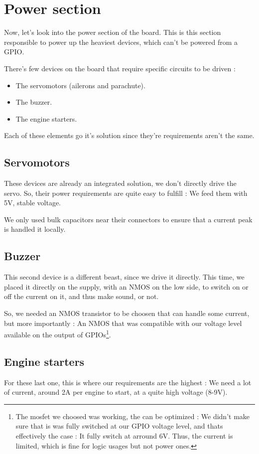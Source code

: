\section{Power section}
Now, let's look into the power section of the board. This is this section
responsible to power up the heaviest devices, which can't be powered from a
GPIO.

There's few devices on the board that require specific circuits to be driven :

\begin{itemize}[noitemsep]
    \item   The servomotors (ailerons and parachute).
    \item   The buzzer.
    \item   The engine starters.
\end{itemize}

Each of these elements go it's solution since they're requirements aren't the
same.

\subsection{Servomotors}
These devices are already an integrated solution, we don't directly drive the
servo. So, their power requirements are quite easy to fulfill : We feed them
with 5V, stable voltage.

We only used bulk capacitors near their connectors to ensure that a current
peak is handled it locally.

\subsection{Buzzer}
This second device is a different beast, since we drive it directly. This time,
we placed it directly on the supply, with an NMOS on the low side, to switch on
or off the current on it, and thus make sound, or not.

So, we needed an NMOS transistor to be choosen that can handle some current,
but more importantly : An NMOS that was compatible with our voltage level
available on the output of GPIOs\footnote{ The mosfet we choosed was working,
    the can be optimized : We didn't make sure that is was fully switched at our
    GPIO voltage level, and thats effectively the case : It fully switch at arround
    6V. Thus, the current is limited, which is fine for logic usages but not power
    ones. }.

\subsection{Engine starters}
For these last one, this is where our requirements are the highest : We need a
lot of current, around 2A per engine to start, at a quite high voltage (8-9V).

